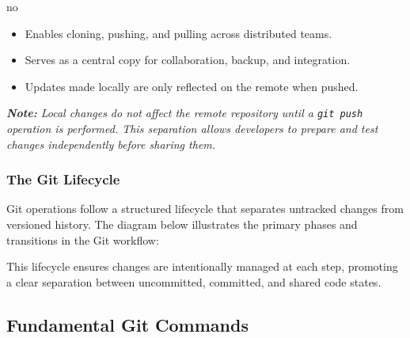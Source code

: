 no\documentclass{article}
\begin{document}
\begin{itemize}
    \item Enables cloning, pushing, and pulling across distributed teams.
    \item Serves as a central copy for collaboration, backup, and integration.
    \item Updates made locally are only reflected on the remote when pushed.
\end{itemize}

\noindent\textit{\textbf{Note:} Local changes do not affect the remote repository until a \texttt{git push} operation is performed. This separation allows developers to prepare and test changes independently before sharing them.}

\subsubsection{The Git Lifecycle}

Git operations follow a structured lifecycle that separates untracked changes from versioned history. The diagram below illustrates the primary phases and transitions in the Git workflow:

\begin{center}
\end{center}

This lifecycle ensures changes are intentionally managed at each step, promoting a clear separation between uncommitted, committed, and shared code states.

\subsection{Fundamental Git Commands}
\end{document}
